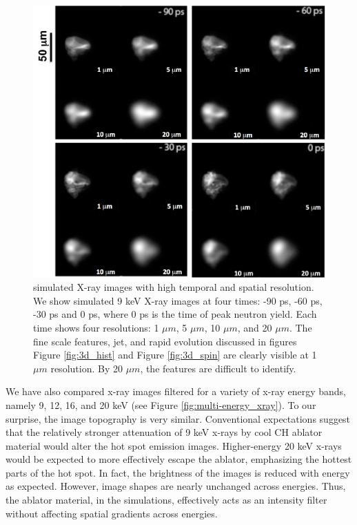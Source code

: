 \documentclass[aip,pop,numerical,reprint,floatfix]{revtex4-1}
\begin{document}
\begin{figure}[h]
\begin{centering}
\includegraphics[width=0.8\paperwidth]{dixi_sim}
\par\end{centering}
\caption{\label{fig:dixi-image}simulated X-ray images with high temporal and spatial resolution.  We show simulated 9 keV X-ray images at four times: -90 ps, -60 ps, -30 ps and 0 ps, where 0 ps is the time of peak neutron yield. Each time shows four resolutions: 1 $\mu m$,  5 $\mu m$, 10 $\mu m$, and 20 $\mu m$. The fine scale features, jet, and rapid evolution discussed in figures Figure \ref{fig:3d_hist} and Figure \ref{fig:3d_spin} are clearly visible at 1 $\mu m$ resolution. By 20 $\mu m$, the features are difficult to identify. }
\end{figure}

We have also compared x-ray images filtered for a variety of x-ray
energy bands, namely 9, 12, 16, and 20 keV (see Figure \ref{fig:multi-energy_xray}).
To our surprise, the image topography is very similar. Conventional
expectations suggest that the relatively stronger attenuation of 9
keV x-rays by cool CH ablator material would alter the hot spot emission
images. Higher-energy 20 keV x-rays would be expected to more effectively
escape the ablator, emphasizing the hottest parts of the hot spot.
In fact, the brightness of the images is reduced with energy as expected.
However, image shapes are nearly unchanged across energies. Thus,
the ablator material, in the simulations, effectively acts as an intensity
filter without affecting spatial gradients across energies.
\end{document}
